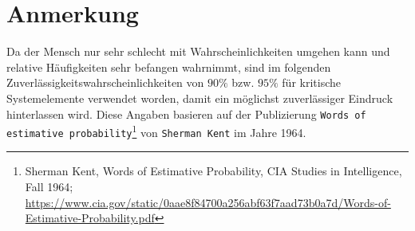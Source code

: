 \section*{Anmerkung}
Da der Mensch nur sehr schlecht mit Wahrscheinlichkeiten umgehen kann und relative Häufigkeiten sehr befangen wahrnimmt,
sind im folgenden Zuverlässigkeitswahrscheinlichkeiten von $90\%$ bzw. $95\%$ für kritische Systemelemente verwendet worden,
damit ein möglichst zuverlässiger Eindruck hinterlassen wird.
Diese Angaben basieren auf der Publizierung \texttt{Words of estimative probability}\footnote{Sherman Kent, Words of Estimative Probability, CIA Studies in Intelligence, Fall 1964; \href{https://www.cia.gov/static/0aae8f84700a256abf63f7aad73b0a7d/Words-of-Estimative-Probability.pdf}{https://www.cia.gov/static/0aae8f84700a256abf63f7aad73b0a7d/Words-of-Estimative-Probability.pdf}}
von \texttt{Sherman Kent} im Jahre 1964.